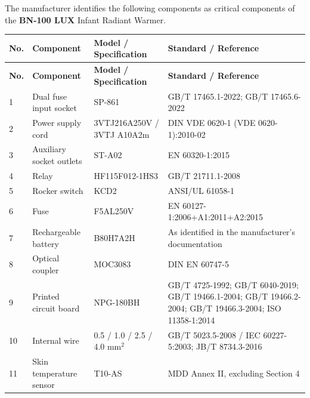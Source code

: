 The manufacturer identifies the following components as critical
components of the \textbf{BN-100 LUX} Infant Radiant Warmer.

\begingroup
\small
\setlength{\tabcolsep}{3pt}
\renewcommand{\arraystretch}{1.2}

\begin{longtable}{|
    >{\centering\arraybackslash}p{}|
    p{}|
    p{}|
    p{}|}
\hline
\textbf{No.} &
\textbf{Component} &
\textbf{Model / Specification} &
\textbf{Standard / Reference} \\
\hline
\endfirsthead

\hline
\textbf{No.} &
\textbf{Component} &
\textbf{Model / Specification} &
\textbf{Standard / Reference} \\
\hline
\endhead

1 &
Dual fuse input socket &
SP-861 &
GB/T 17465.1-2022; GB/T 17465.6-2022 \\
\hline

2 &
Power supply cord &
3VTJ216A250V / 3VTJ A10A2m &
DIN VDE 0620-1 (VDE 0620-1):2010-02 \\
\hline

3 &
Auxiliary socket outlets &
ST-A02 &
EN 60320-1:2015 \\
\hline

4 &
Relay &
HF115F012-1HS3 &
GB/T 21711.1-2008 \\
\hline

5 &
Rocker switch &
KCD2 &
ANSI/UL 61058-1 \\
\hline

6 &
Fuse &
F5AL250V &
EN 60127-1:2006+A1:2011+A2:2015 \\
\hline

7 &
Rechargeable battery &
B80H7A2H &
As identified in the manufacturer's documentation \\
\hline

8 &
Optical coupler &
MOC3083 &
DIN EN 60747-5 \\
\hline

9 &
Printed circuit board &
NPG-180BH &
GB/T 4725-1992; GB/T 6040-2019;
GB/T 19466.1-2004; GB/T 19466.2-2004;
GB/T 19466.3-2004; ISO 11358-1:2014 \\
\hline

10 &
Internal wire &
0.5 / 1.0 / 2.5 / 4.0 mm$^2$ &
GB/T 5023.5-2008 / IEC 60227-5:2003;
JB/T 8734.3-2016 \\
\hline

11 &
Skin temperature sensor &
T10-AS &
MDD Annex II, excluding Section 4 \\
\hline


\end{longtable}
